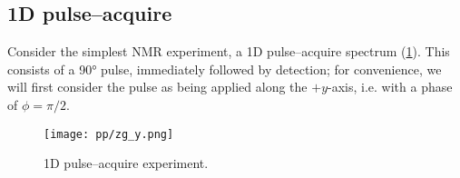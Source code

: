 \subsection{1D pulse--acquire}
\label{subsec:theory__pulseacq}

Consider the simplest NMR experiment, a 1D \proton{} pulse--acquire spectrum (\cref{fig:pulse_acquire}).
This consists of a \ang{90} pulse, immediately followed by detection; for convenience, we will first consider the pulse as being applied along the $+y$-axis, i.e. with a phase of $\phi = \pi/2$.

\begin{figure}[htbp]
    \centering
    \label{fig:pulse_acquire}
    \texttt{[image: pp/zg\_y.png]}%
    \caption[Pulse--acquire experiment]{1D \proton{} pulse--acquire experiment.}
\end{figure}

